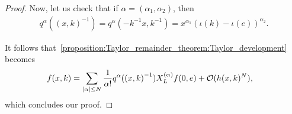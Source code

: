 \begin{proof}
    Now, let us check that if $\alpha = (\alpha_1, \alpha_2)$, then
    \begin{align*}
        q^\alpha({(x, k)}^{-1})
        = q^\alpha(-k^{-1} x, k^{-1})
        = x^{\alpha_1} {(\iota(k) - \iota(e))}^{\alpha_2}.
    \end{align*}

    It follows that~\eqref{proposition:Taylor_remainder_theorem:Taylor_development} becomes
    \begin{align*}
        f(x, k) &= \sum_{\left|{\alpha}\right| \leq N} \frac{1}{\alpha!} q^\alpha({(x, k)}^{-1}) X^{(\alpha)}_L f(0, e) + \mathcal{O}(h(x, k)^N),
    \end{align*}
    which concludes our proof.
\end{proof}
